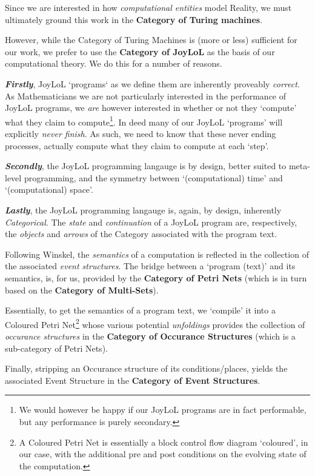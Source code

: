 
Since we are interested in how \emph{computational entities} model Reality, we
must ultimately ground this work in the \textbf{Category of Turing machines}.

However, while the Category of Turing Machines is (more or less) sufficient for
our work, we prefer to use the \textbf{Category of JoyLoL} as the basis of our
computational theory. We do this for a number of reasons.

\textbf{\textit{Firstly}}, JoyLoL `programs` as we define them are inherently
proveably \emph{correct}. As Mathematicians we are not particularly interested
in the performance of JoyLoL programs, we \emph{are} however interested in
whether or not they `compute' what they claim to compute\footnote{We would
however be happy if our JoyLoL programs are in fact performable, but any
performance is purely secondary.}. In deed many of our JoyLoL `programs' will
explicitly \emph{never finish}. As such, we need to know that these never ending
processes, actually compute what they claim to compute at each `step'.

\textbf{\textit{Secondly}}, the JoyLoL programming langauge is by design, better
suited to meta-level programming, and the symmetry between `(computational)
time' and `(computational) space'.

\textbf{\textit{Lastly}}, the JoyLoL programming langauge is, again, by design,
inherently \emph{Categorical}. The \emph{state} and \emph{continuation} of a
JoyLoL program are, respectively, the \emph{objects} and \emph{arrows} of the
Category associated with the program text.

Following Winskel, the \emph{semantics} of a computation is reflected in the
collection of the associated \emph{event structures}. The bridge between a
`program (text)' and its semantics, is, for us, provided by the \textbf{Category
of Petri Nets} (which is in turn based on the \textbf{Category of Multi-Sets}).

Essentially, to get the semantics of a program text, we `compile' it into a
Coloured Petri Net\footnote{A Coloured Petri Net is essentially a block control
flow diagram `coloured', in our case, with the additional pre and post
conditions on the evolving state of the computation.} whose various potential
\emph{unfoldings} provides the collection of \emph{occurance structures} in the
\textbf{Category of Occurance Structures} (which is a sub-category of Petri
Nets).

Finally, stripping an Occurance structure of its conditions/places, yields the
associated Event Structure in the \textbf{Category of Event Structures}.

